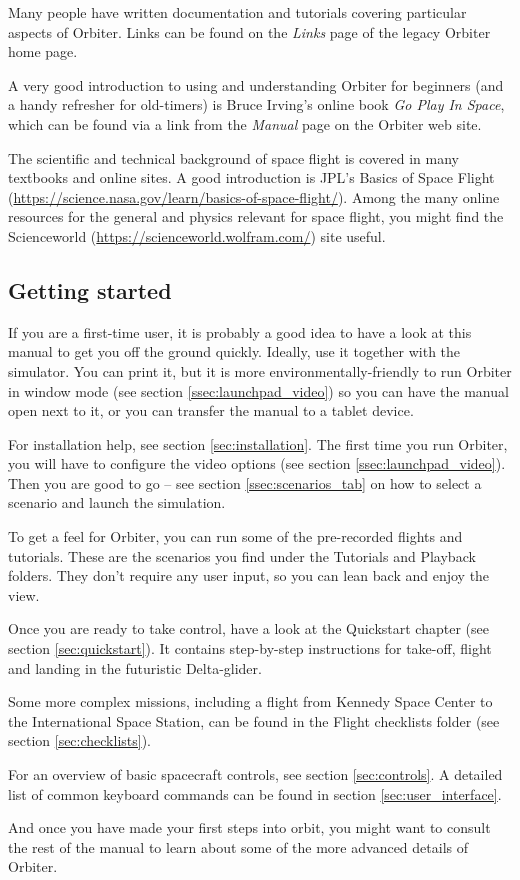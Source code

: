 \documentclass[Orbiter User Manual.tex]{subfiles}
\begin{document}
Many people have written documentation and tutorials covering particular aspects
of Orbiter. Links can be found on the \emph{Links} page of the legacy Orbiter
home page.

A very good introduction to using and understanding Orbiter for beginners (and a
handy refresher for old-timers) is Bruce Irving's online book \emph{Go Play In
Space}, which can be found via a link from the \emph{Manual} page on the Orbiter
web site.

The scientific and technical background of space flight is covered in many
textbooks and online sites. A good introduction is JPL's Basics of Space Flight
(\url{https://science.nasa.gov/learn/basics-of-space-flight/}). Among the many
online resources for the general and physics relevant for space flight, you
might find the Scienceworld (\url{https://scienceworld.wolfram.com/}) site
useful.


\subsection{Getting started}

If you are a first-time user, it is probably a good idea to have a look at this
manual to get you off the ground quickly. Ideally, use it together with the
simulator. You can print it, but it is more environmentally-friendly to run
Orbiter in window mode (see section \ref{ssec:launchpad_video}) so you can have
the manual open next to it, or you can transfer the manual to a tablet device.

For installation help, see section \ref{sec:installation}. The first time you
run Orbiter, you will have to configure the video options (see section
\ref{ssec:launchpad_video}). Then you are good to go -- see section
\ref{ssec:scenarios_tab} on how to select a scenario and launch the simulation.

To get a feel for Orbiter, you can run some of the pre-recorded flights and
tutorials. These are the scenarios you find under the Tutorials and Playback
folders. They don't require any user input, so you can lean back and enjoy the
view.

Once you are ready to take control, have a look at the Quickstart chapter (see
section \ref{sec:quickstart}). It contains step-by-step instructions for
take-off, flight and landing in the futuristic Delta-glider.

Some more complex missions, including a flight from Kennedy Space Center to the
International Space Station, can be found in the Flight checklists folder (see
section \ref{sec:checklists}).

For an overview of basic spacecraft controls, see section \ref{sec:controls}. A
detailed list of common keyboard commands can be found in section
\ref{sec:user_interface}.

And once you have made your first steps into orbit, you might want to consult
the rest of the manual to learn about some of the more advanced details of
Orbiter.
\end{document}
